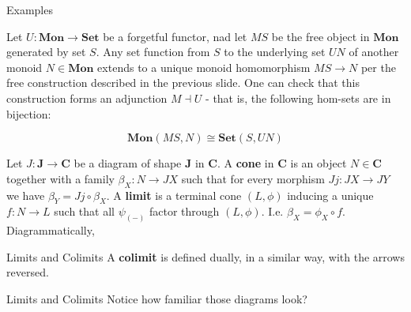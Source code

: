 \documentclass[tikz]{beamer}
\theoremstyle{definition}
\newcommand{\cat}[1]{\mathbf{#1}}
\begin{document}
\begin{frame}{Examples}

Let $U: \cat{Mon} \to \cat{Set}$ be a forgetful functor, nad let $MS$ be the free object in $\cat{Mon}$ generated by set $S$. Any set function from $S$ to the underlying set $UN$ of another monoid $N \in \cat{Mon}$ extends to a unique monoid homomorphism $MS \to N$ per the free construction described in the previous slide. One can check that this construction forms an adjunction $ M \dashv U$ - that is, the following hom-sets are in bijection:

\begin{center}
    \begin{equation*}
        \cat{Mon}(MS, N) \cong \cat{Set}(S, UN)
    \end{equation*}{}
\end{center}

\end{frame}

\begin{frame}[fragile]

Let $J: \cat{J} \to \cat{C}$ be a diagram of shape $\cat{J}$ in $\cat{C}$. A \textbf{cone} in $\cat{C}$ is an object $N \in \cat{C}$ together with a family $\beta_X: N \to JX$ such that for every morphism $Jj: JX \to JY$ we have $\beta_Y = Jj \circ \beta_X$. A \textbf{limit} is a terminal cone $(L, \phi)$ inducing a unique $f: N \to L$ such that all $\psi_{(-)}$ factor through $(L, \phi)$. I.e. $\beta_X = \phi_X \circ f$. Diagrammatically,

\begin{center}
\end{center}

\end{frame}

\begin{frame}{Limits and Colimits}
A \textbf{colimit} is defined dually, in a  similar way, with the arrows reversed.
\end{frame}

\begin{frame}{Limits and Colimits}
Notice how familiar those diagrams look?
\end{frame}
\end{document}
